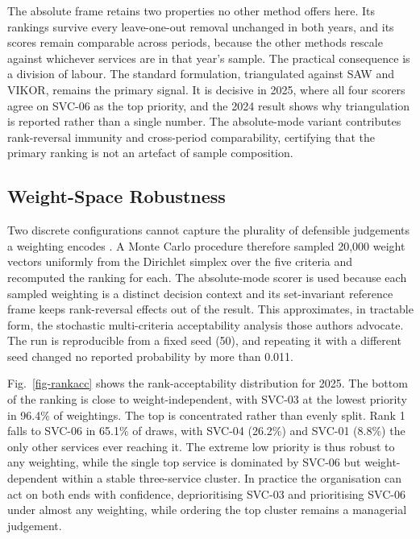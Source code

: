 \documentclass[
  journal,
]{IEEEtran}%
\begin{document}
The absolute frame retains two properties no other method offers here.
Its rankings survive every leave-one-out removal unchanged in both
years, and its scores remain comparable across periods, because the
other methods rescale against whichever services are in that year's
sample. The practical consequence is a division of labour. The standard
formulation, triangulated against SAW and VIKOR, remains the primary
signal. It is decisive in 2025, where all four scorers agree on SVC-06
as the top priority, and the 2024 result shows why triangulation is
reported rather than a single number. The absolute-mode variant
contributes rank-reversal immunity and cross-period comparability,
certifying that the primary ranking is not an artefact of sample
composition.

\subsection{Weight-Space Robustness}\label{sec-montecarlo}

Two discrete configurations cannot capture the plurality of defensible
judgements a weighting encodes
. A
Monte Carlo procedure therefore sampled 20,000 weight vectors uniformly
from the Dirichlet simplex over the five criteria and recomputed the
ranking for each. The absolute-mode scorer is used because each sampled
weighting is a distinct decision context and its set-invariant reference
frame keeps rank-reversal effects out of the result. This approximates,
in tractable form, the stochastic multi-criteria acceptability analysis
those authors advocate. The run is reproducible from a fixed seed (50),
and repeating it with a different seed changed no reported probability
by more than 0.011.

Fig.~\ref{fig-rankacc} shows the rank-acceptability distribution for
2025. The bottom of the ranking is close to weight-independent, with
SVC-03 at the lowest priority in 96.4\% of weightings. The top is
concentrated rather than evenly split. Rank 1 falls to SVC-06 in 65.1\%
of draws, with SVC-04 (26.2\%) and SVC-01 (8.8\%) the only other
services ever reaching it. The extreme low priority is thus robust to
any weighting, while the single top service is dominated by SVC-06 but
weight-dependent within a stable three-service cluster. In practice the
organisation can act on both ends with confidence, deprioritising SVC-03
and prioritising SVC-06 under almost any weighting, while ordering the
top cluster remains a managerial judgement.
\end{document}
